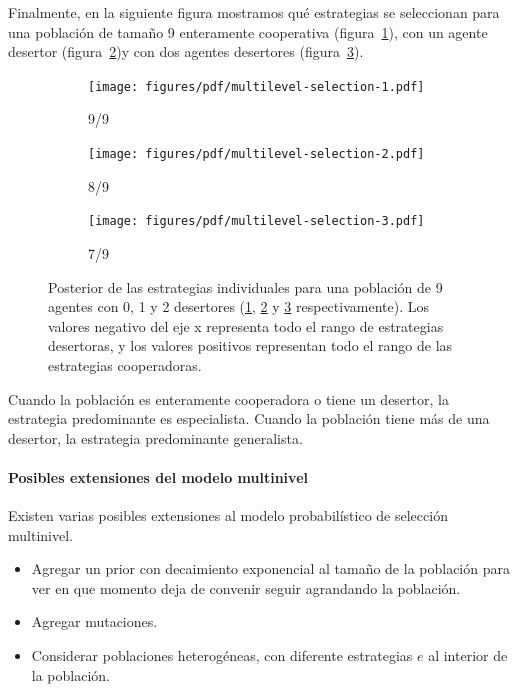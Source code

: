\documentclass[a4paper,10pt]{article}
\begin{document}
{%

Finalmente, en la siguiente figura mostramos qué estrategias se seleccionan para una población de tamaño 9 enteramente cooperativa (figura~\ref{fig:multilevel-selection-1}), con un agente desertor (figura~\ref{fig:multilevel-selection-2})y con dos agentes desertores (figura~\ref{fig:multilevel-selection-3}).
%
\begin{figure}[H]
    \centering
    \begin{subfigure}[b]{0.32\textwidth}
    \texttt{[image: figures/pdf/multilevel-selection-1.pdf]}
    \caption{9/9}
    \label{fig:multilevel-selection-1}
    \end{subfigure}
    \begin{subfigure}[b]{0.32\textwidth}
    \texttt{[image: figures/pdf/multilevel-selection-2.pdf]}
    \caption{8/9}
    \label{fig:multilevel-selection-2}
    \end{subfigure}
    \begin{subfigure}[b]{0.32\textwidth}
    \texttt{[image: figures/pdf/multilevel-selection-3.pdf]}
    \caption{7/9}
    \label{fig:multilevel-selection-3}
    \end{subfigure}
    \caption{
    Posterior de las estrategias individuales para una población de 9 agentes con 0, 1 y 2 desertores (\ref{fig:multilevel-selection-1}, \ref{fig:multilevel-selection-2} y \ref{fig:multilevel-selection-3} respectivamente).
    Los valores negativo del eje x representa todo el rango de estrategias desertoras, y los valores positivos representan todo el rango de las estrategias cooperadoras.
    }
    \label{fig:multilevel-selection-123}
\end{figure}
%
Cuando la población es enteramente cooperadora o tiene un desertor, la estrategia predominante es especialista.
Cuando la población tiene más de una desertor, la estrategia predominante generalista.


\paragraph{Posibles extensiones del modelo multinivel} Existen varias posibles extensiones al modelo probabilístico de selección multinivel.
\begin{itemize}
\item Agregar un prior con decaimiento exponencial al tamaño de la población para ver en que momento deja de convenir seguir agrandando la población.
\item Agregar mutaciones.
\item Considerar poblaciones heterogéneas, con diferente estrategias $e$ al interior de la población.
\end{itemize}



}
\end{document}
